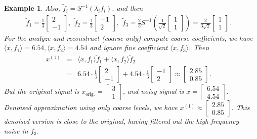 \documentclass[12pt,titlepage]{amsart}
\newtheorem{exam}[thm]{Example}
\theoremstyle{definition}
\theoremstyle{remark}
\begin{document}
\begin{exam}
Also, $\tilde{f}_i = S^{-1}(\lambda_i f_i)$, and then
\begin{eqnarray*}
 \tilde{f}_1 =
\frac{1}{3}
\begin{bmatrix}2 \\ -1\end{bmatrix}, \,\ \tilde{f}_2 =
\frac{1}{3} \begin{bmatrix}-1 \\ 2\end{bmatrix}, \,\  \tilde{f}_3
= \frac{2}{3} S^{-1} \left( \frac{1}{\sqrt{2}}
\begin{bmatrix}1 \\ 1\end{bmatrix} \right) = \frac{2}{3\sqrt{2}}
\begin{bmatrix}1 \\ 1\end{bmatrix}.
\end{eqnarray*}
For the analyze and reconstruct (coarse only) compute coarse
coefficients, we have $\langle x, f_1 \rangle = 6.54, \langle x,
f_2 \rangle = 4.54$ and ignore fine coefficient $\langle x, f_3
\rangle$. Then
\begin{eqnarray*}
 x^{(1)} &=& \langle x, f_1 \rangle \tilde{f}_1 +
\langle x, f_2 \rangle \tilde{f}_2 \\
&=& 6.54 \cdot \frac{1}{3}
\begin{bmatrix}2
\\ -1\end{bmatrix} + 4.54 \cdot \frac{1}{3} \begin{bmatrix}-1 \\
2\end{bmatrix} \approx \begin{bmatrix}2.85 \\
0.85\end{bmatrix}.
\end{eqnarray*}
But the original signal is $x_{\text{orig.}} =
\begin{bmatrix}3 \\ 1\end{bmatrix}$, and noisy signal is $x =
\begin{bmatrix}6.54 \\ 4.54\end{bmatrix}$. Denoised approximation
using only coarse levels, we have $x^{(1)} \approx
\begin{bmatrix}2.85 \\ 0.85\end{bmatrix}$. This denoised version is
close to the original, having filtered out the high-frequency
noise in $f_3$.
\end{exam}
\end{document}
